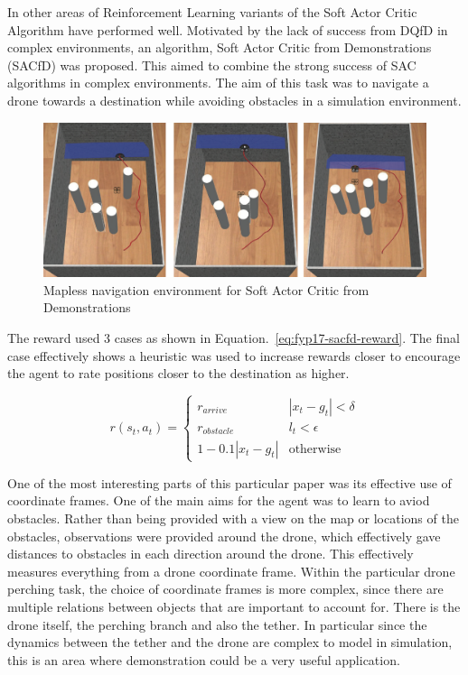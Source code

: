 
In other areas of Reinforcement Learning variants of the Soft Actor Critic Algorithm have performed well.
Motivated by the lack of success from DQfD in complex environments, an algorithm, Soft Actor Critic from Demonstrations (SACfD) was proposed\cite{SACfDMaplessNavigation}.
This aimed to combine the strong success of SAC algorithms in complex environments.
The aim of this task was to navigate a drone towards a destination while avoiding obstacles in a simulation environment.

\begin{figure}[htbp]
  \centering
  \includegraphics[width=\textwidth]{background/fyp17-sacfd.png}
  \caption{Mapless navigation environment for Soft Actor Critic from Demonstrations}
\label{fig:fyp17-sacfd}
\end{figure}

The reward used 3 cases as shown in Equation.~\ref*{eq:fyp17-sacfd-reward}. 
The final case effectively shows a heuristic was used to increase rewards closer to encourage the agent to rate positions closer to the destination as higher.

\begin{equation}
  r(s_{t}, a_{t}) =
  \begin{cases} 
    r_{arrive} & |x_{t} - g_{t}| < \delta \\
    r_{obstacle} & l_{t} < \epsilon \\
    1-0.1 |x_{t} - g_{t}| & \text{otherwise}
  \end{cases}
  \label{eq:fyp17-sacfd-reward}
\end{equation}

One of the most interesting parts of this particular paper was its effective use of coordinate frames.
One of the main aims for the agent was to learn to aviod obstacles.
Rather than being provided with a view on the map or locations of the obstacles, observations were provided around the drone, which effectively gave distances to obstacles in each direction around the drone.
This effectively measures everything from a drone coordinate frame.
Within the particular drone perching task, the choice of coordinate frames is more complex, since there are multiple relations between objects that are important to account for.
There is the drone itself, the perching branch and also the tether.
In particular since the dynamics between the tether and the drone are complex to model in simulation, this is an area where demonstration could be a very useful application.

